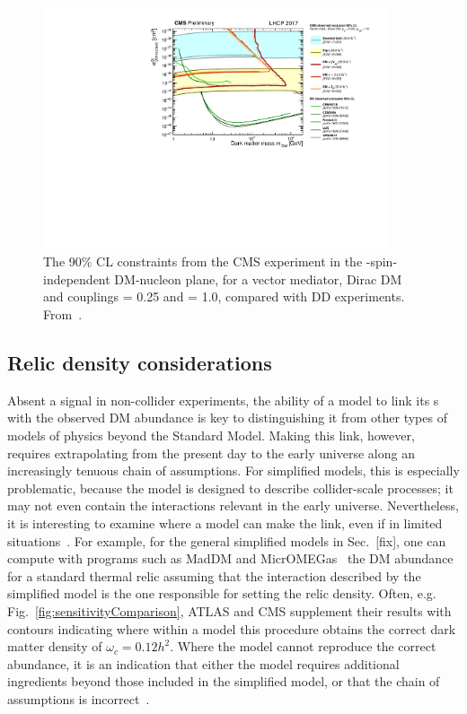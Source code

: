 \begin{figure}[!htpb]
\includegraphics[width=0.9\textwidth]{figures/SI_CMSDD_Summary}
\caption{The 90\% CL constraints from the CMS experiment in the \mdm-spin-independent DM-nucleon plane, for a vector mediator, Dirac DM and couplings \gq = 0.25 and \gdm = 1.0, compared with DD experiments. From~\cite{CMSSummary}.}
\label{fig:SICMS}
\end{figure}

\subsection{Relic density considerations}
Absent a signal in non-collider experiments, the ability of a model to link its {\IP}s with the observed DM abundance is key to distinguishing it from other types of models of physics beyond the Standard Model.
Making this link, however, requires extrapolating from the present day to the early universe along an increasingly tenuous chain of assumptions.
For simplified models, this is especially problematic, because the model is designed to describe collider-scale processes; it may not even contain the interactions relevant in the early universe.
Nevertheless, it is interesting to examine where a model can make the link, even if in limited situations~\cite{Busoni:2014gta,Catena:2017xqq}.
For example, for the general simplified models in Sec.~[fix], one can compute with programs such as MadDM and MicrOMEGas~\cite{Backovic:2015cra,Barducci:2016pcb} the DM abundance for a standard thermal relic assuming that the interaction described by the simplified model is the one responsible for setting the relic density.
Often, e.g. Fig.~\ref{fig:sensitivityComparison}, ATLAS and CMS supplement their results with contours indicating where within a model this procedure obtains the correct dark matter density of $\omega_c = 0.12 h^2$.
Where the model cannot reproduce the correct abundance, it is an indication that either the model requires additional ingredients beyond those included in the simplified model, or that the chain of assumptions is incorrect~\cite{Bernal:2017kxu}.
